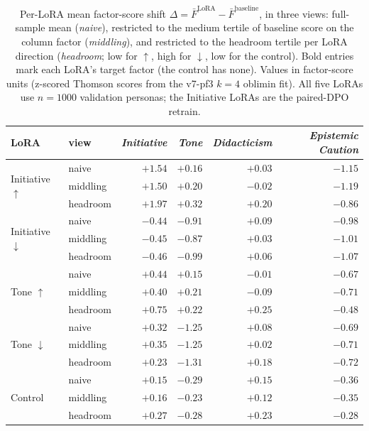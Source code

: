 \begin{table}[htbp]
\centering
\small
\caption{Per-LoRA mean factor-score shift $\Delta = \bar{F}^{\text{LoRA}} - \bar{F}^{\text{baseline}}$, in three views: full-sample mean (\emph{naive}), restricted to the medium tertile of baseline score on the column factor (\emph{middling}), and restricted to the headroom tertile per LoRA direction (\emph{headroom}; low for $\uparrow$, high for $\downarrow$, low for the control). Bold entries mark each LoRA's target factor (the control has none). Values in factor-score units (z-scored Thomson scores from the v7-pf3 $k=4$ oblimin fit). All five LoRAs use $n=1000$ validation personas; the Initiative LoRAs are the paired-DPO retrain.}
\label{tab:4-2-lora-shifts}
\begin{tabular}{l l r r r r}
\toprule
LoRA & view & \textit{Initiative} & \textit{Tone} & \textit{Didacticism} & \textit{Epistemic Caution} \\
\midrule
\multirow{3}{*}{Initiative $\uparrow$}
  & naive    & $\mathbf{+1.54}$ & $+0.16$ & $+0.03$ & $-1.15$ \\
  & middling & $\mathbf{+1.50}$ & $+0.20$ & $-0.02$ & $-1.19$ \\
  & headroom & $\mathbf{+1.97}$ & $+0.32$ & $+0.20$ & $-0.86$ \\
\midrule
\multirow{3}{*}{Initiative $\downarrow$}
  & naive    & $\mathbf{-0.44}$ & $-0.91$ & $+0.09$ & $-0.98$ \\
  & middling & $\mathbf{-0.45}$ & $-0.87$ & $+0.03$ & $-1.01$ \\
  & headroom & $\mathbf{-0.46}$ & $-0.99$ & $+0.06$ & $-1.07$ \\
\midrule
\multirow{3}{*}{Tone $\uparrow$}
  & naive    & $+0.44$ & $\mathbf{+0.15}$ & $-0.01$ & $-0.67$ \\
  & middling & $+0.40$ & $\mathbf{+0.21}$ & $-0.09$ & $-0.71$ \\
  & headroom & $+0.75$ & $\mathbf{+0.22}$ & $+0.25$ & $-0.48$ \\
\midrule
\multirow{3}{*}{Tone $\downarrow$}
  & naive    & $+0.32$ & $\mathbf{-1.25}$ & $+0.08$ & $-0.69$ \\
  & middling & $+0.35$ & $\mathbf{-1.25}$ & $+0.02$ & $-0.71$ \\
  & headroom & $+0.23$ & $\mathbf{-1.31}$ & $+0.18$ & $-0.72$ \\
\midrule
\multirow{3}{*}{Control}
  & naive    & $+0.15$ & $-0.29$ & $+0.15$ & $-0.36$ \\
  & middling & $+0.16$ & $-0.23$ & $+0.12$ & $-0.35$ \\
  & headroom & $+0.27$ & $-0.28$ & $+0.23$ & $-0.28$ \\
\bottomrule
\end{tabular}
\end{table}

